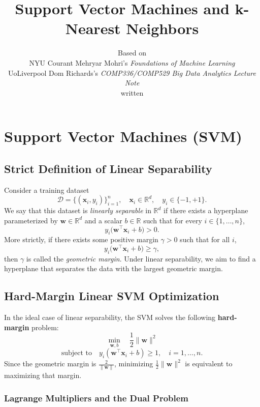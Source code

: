 \documentclass[11pt]{article}
\title{\textbf{Support Vector Machines and k-Nearest Neighbors}}
\author{Based on \\ NYU Courant Mehryar Mohri's \textit{Foundations of Machine Learning} \\ UoLiverpool Dom Richards's \textit{COMP336/COMP529 Big Data Analytics Lecture Note} \\ written}
\date{}
\begin{document}
\maketitle

\section{Support Vector Machines (SVM)}

\subsection{Strict Definition of Linear Separability}

Consider a training dataset
\[
\mathcal{D} = \{(\mathbf{x}_i, y_i)\}_{i=1}^n, \quad \mathbf{x}_i \in \mathbb{R}^d, \quad y_i \in \{-1, +1\}.
\]
We say that this dataset is \textit{linearly separable} in \(\mathbb{R}^d\) if there exists a hyperplane parameterized by \(\mathbf{w} \in \mathbb{R}^d\) and a scalar \(b \in \mathbb{R}\) such that for every \(i \in \{1, \dots, n\}\),
\[
y_i\bigl(\mathbf{w}^\top \mathbf{x}_i + b\bigr) > 0.
\]
More strictly, if there exists some positive margin \(\gamma > 0\) such that for all \(i\),
\[
y_i\bigl(\mathbf{w}^\top \mathbf{x}_i + b\bigr) \ge \gamma,
\]
then \(\gamma\) is called the \textit{geometric margin}. Under linear separability, we aim to find a hyperplane that separates the data with the largest geometric margin.

\subsection{Hard-Margin Linear SVM Optimization}

In the ideal case of linear separability, the SVM solves the following \textbf{hard-margin} problem:
\[
\min_{\mathbf{w}, b} \quad \frac{1}{2}\|\mathbf{w}\|^2
\]
\[
\text{subject to}\quad y_i(\mathbf{w}^\top \mathbf{x}_i + b) \geq 1, \quad i=1,\ldots,n.
\]
Since the geometric margin is \(\frac{2}{\|\mathbf{w}\|}\), minimizing \(\frac{1}{2}\|\mathbf{w}\|^2\) is equivalent to maximizing that margin.

\subsubsection{Lagrange Multipliers and the Dual Problem}
\end{document}
